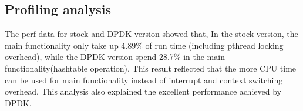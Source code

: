 \documentclass[bsc,frontabs,twoside,singlespacing,parskip,deptreport]{infthesis}     %
\begin{document}
\subsection{Profiling analysis}

The perf data for stock and DPDK version showed that, In the stock version, the main functionality only take up 4.89\% of run time (including pthread locking overhead), while the DPDK version spend 28.7\% in the main functionality(hashtable operation). This result reflected that the more CPU time can be used for main functionality instead of interrupt and context switching overhead. This analysis also explained the excellent performance achieved by DPDK.








\end{document}
